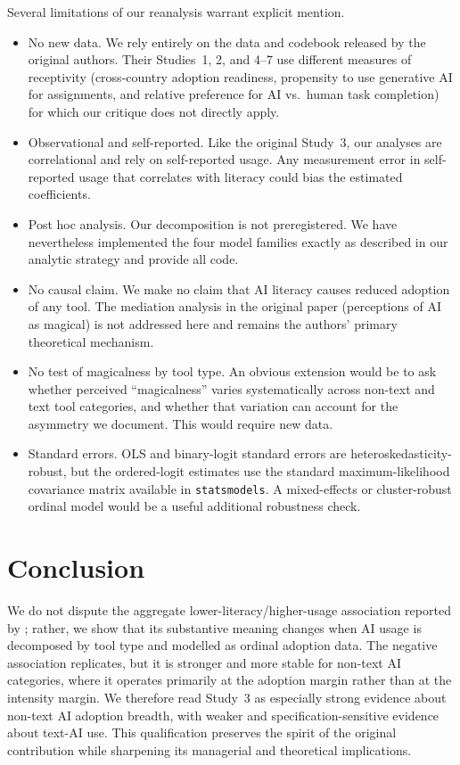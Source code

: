 \documentclass[11pt]{article}
\begin{document}
Several limitations of our reanalysis warrant explicit mention.

\begin{itemize}
  \item No new data. We rely entirely on the data and codebook released
    by the original authors. Their Studies~1, 2, and 4--7 use different
    measures of receptivity (cross-country adoption readiness, propensity
    to use generative AI for assignments, and relative preference for AI
    vs.\ human task completion) for which our critique does not directly
    apply.
  \item Observational and self-reported. Like the original Study~3,
    our analyses are correlational and rely on self-reported usage. Any
    measurement error in self-reported usage that correlates with literacy
    could bias the estimated coefficients.
  \item Post hoc analysis. Our decomposition is not preregistered.
    We have nevertheless implemented the four model families exactly as
    described in our analytic strategy and provide all code.
  \item No causal claim. We make no claim that AI literacy
    causes reduced adoption of any tool. The mediation analysis in
    the original paper (perceptions of AI as magical) is not addressed here
    and remains the authors' primary theoretical mechanism.
  \item No test of magicalness by tool type. An obvious extension
    would be to ask whether perceived ``magicalness'' varies systematically
    across non-text and text tool categories, and whether that variation
    can account for the asymmetry we document. This would require new data.
  \item Standard errors. OLS and binary-logit standard errors are
    heteroskedasticity-robust, but the ordered-logit estimates use the
    standard maximum-likelihood covariance matrix available in
    \texttt{statsmodels}. A mixed-effects or cluster-robust ordinal model would
    be a useful additional robustness check.
\end{itemize}

\section{Conclusion}

We do not dispute the aggregate lower-literacy/higher-usage association
reported by \citet{tully2025lower}; rather, we show that its substantive
meaning changes when AI usage is decomposed by tool type and modelled as
ordinal adoption data. The negative association replicates, but it is stronger
and more stable for non-text AI categories, where it operates primarily at the
adoption margin rather than at the intensity margin. We therefore read Study~3
as especially strong evidence about non-text AI adoption breadth, with weaker
and specification-sensitive evidence about text-AI use. This qualification
preserves the spirit of the original contribution while sharpening its
managerial and theoretical implications.
\end{document}
